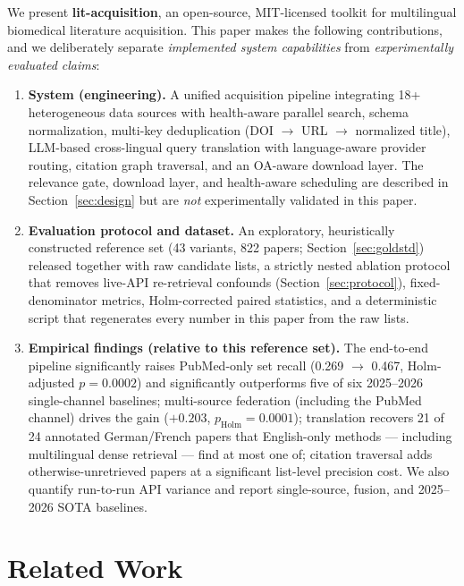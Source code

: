 \documentclass[nonacm,sigconf]{acmart}
\begin{document}
We present \textbf{lit-acquisition}, an open-source, MIT-licensed toolkit for
multilingual biomedical literature acquisition. This paper makes the
following contributions, and we deliberately separate \emph{implemented
system capabilities} from \emph{experimentally evaluated claims}:

\begin{enumerate}
\item \textbf{System (engineering).} A unified acquisition pipeline
integrating 18+ heterogeneous data sources with health-aware parallel
search, schema normalization, multi-key deduplication
(DOI $\rightarrow$ URL $\rightarrow$ normalized title), LLM-based
cross-lingual query translation with language-aware provider routing,
citation graph traversal, and an OA-aware download layer. The relevance
gate, download layer, and health-aware scheduling are described in
Section~\ref{sec:design} but are \emph{not} experimentally validated in
this paper.
\item \textbf{Evaluation protocol and dataset.} An exploratory,
heuristically constructed reference set (43 variants, 822 papers;
Section~\ref{sec:goldstd}) released together with raw candidate lists, a
strictly nested ablation protocol that removes live-API re-retrieval
confounds (Section~\ref{sec:protocol}), fixed-denominator metrics,
Holm-corrected paired statistics, and a deterministic script that
regenerates every number in this paper from the raw lists.
\item \textbf{Empirical findings (relative to this reference set).} The
end-to-end pipeline significantly raises PubMed-only set recall
(0.269 $\rightarrow$ 0.467, Holm-adjusted $p{=}0.0002$) and significantly
outperforms five of six 2025--2026 single-channel baselines; multi-source
federation (including the PubMed channel) drives the gain
($+0.203$, $p_{\text{Holm}}{=}0.0001$); translation recovers 21 of 24
annotated German/French papers that English-only methods --- including
multilingual dense retrieval --- find at most one of; citation traversal
adds otherwise-unretrieved papers at a significant list-level precision
cost. We also quantify run-to-run API variance and report single-source,
fusion, and 2025--2026 SOTA baselines.
\end{enumerate}

\section{Related Work}
\label{sec:related}
\end{document}
